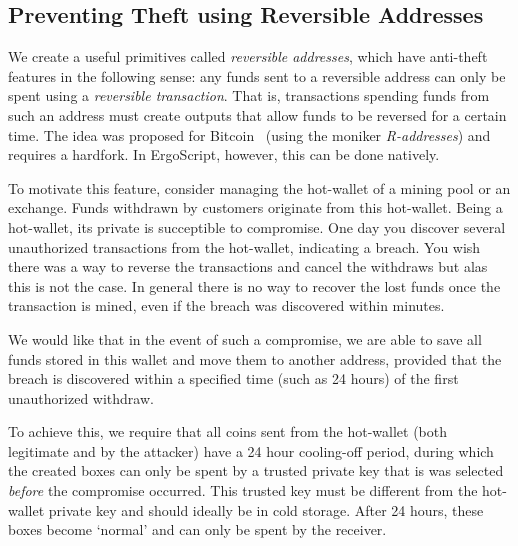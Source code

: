 \documentclass[11pt]{article}
\newcommand{\langname}{ErgoScript\xspace}
\begin{document}
\subsection{Preventing Theft using Reversible Addresses}

We create a useful primitives called {\em reversible addresses}, which have anti-theft features in the following sense:
any funds sent to a reversible address can only be spent using a {\em reversible transaction}. That is, transactions spending funds from such an address must create outputs that allow funds to be reversed for a certain time. The idea was proposed for Bitcoin~\cite{raddress} (using the moniker {\em R-addresses}) and requires a hardfork. In \langname, however, this can be done natively.

To motivate this feature, consider managing the hot-wallet of a mining pool or an exchange. Funds withdrawn by customers originate from this hot-wallet. Being a hot-wallet, its private is succeptible to compromise. One day you discover several unauthorized transactions from the hot-wallet, indicating a breach. You wish there was a way to reverse the transactions and cancel the withdraws but alas this is not the case. In general there is no way to recover the lost funds once the transaction is mined, even if the breach was discovered within minutes. 

We would like that in the event of such a compromise, we are able to save all funds stored in this wallet and move them to another address, provided that the breach is discovered within a specified time (such as 24 hours) of the first unauthorized withdraw. 

To achieve this, we require that all coins sent from the hot-wallet (both legitimate and by the attacker)
have a 24 hour cooling-off period, during which the created boxes can only be spent by a trusted private key that is was selected {\em before} the compromise occurred. This trusted key must be different from the hot-wallet private key and should ideally be in cold storage. 
After 24 hours, these boxes become `normal' and can only be spent by the receiver.
\end{document}
